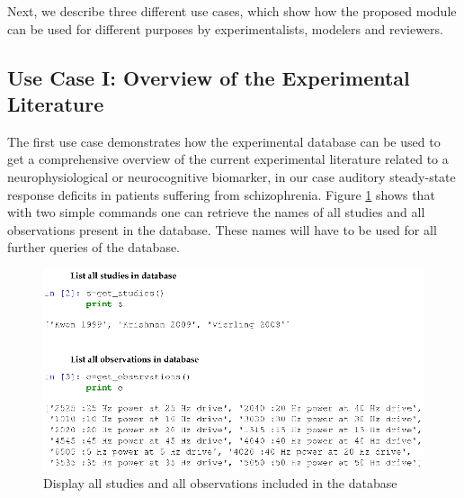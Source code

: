 \documentclass[a4paper,10pt]{article}
\begin{document}
% 
% 


Next, we describe three different use cases, which show how the proposed module can be used for different purposes by experimentalists, modelers and reviewers. 


\subsection{Use Case I: Overview of the Experimental Literature}
The first use case demonstrates how the experimental database can be used to get a comprehensive overview of the current experimental literature related to a neurophysiological or neurocognitive biomarker, in our case
auditory steady-state response deficits in patients suffering from schizophrenia. Figure \ref{Fig:ListStudies} shows that with two
simple commands one can retrieve the names of all studies and all observations present in the database. These names will have to be used for all further queries of the database.

\begin{figure}
\includegraphics[width=\textwidth]{Figures/list_studies_observations}
\caption{Display all studies  and all observations included in the database}
\label{Fig:ListStudies}
\end{figure}
\end{document}
